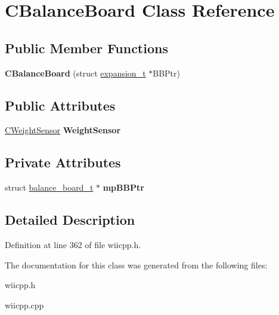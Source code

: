 \hypertarget{class_c_balance_board}{\section{C\-Balance\-Board Class Reference}
\label{class_c_balance_board}
}
\subsection*{Public Member Functions}
\begin{DoxyCompactItemize}
\item 
\hypertarget{class_c_balance_board_a11948fc65e72d912b341ebc866673c1c}{{\bfseries C\-Balance\-Board} (struct \hyperlink{structexpansion__t}{expansion\-\_\-t} $\ast$B\-B\-Ptr)}\label{class_c_balance_board_a11948fc65e72d912b341ebc866673c1c}

\end{DoxyCompactItemize}
\subsection*{Public Attributes}
\begin{DoxyCompactItemize}
\item 
\hypertarget{class_c_balance_board_a3b781ed33ad7255f557d4782728eb045}{\hyperlink{class_c_weight_sensor}{C\-Weight\-Sensor} {\bfseries Weight\-Sensor}}\label{class_c_balance_board_a3b781ed33ad7255f557d4782728eb045}

\end{DoxyCompactItemize}
\subsection*{Private Attributes}
\begin{DoxyCompactItemize}
\item 
\hypertarget{class_c_balance_board_a6e956dd27eede6e72c7d8459d0c15843}{struct \hyperlink{structbalance__board__t}{balance\-\_\-board\-\_\-t} $\ast$ {\bfseries mp\-B\-B\-Ptr}}\label{class_c_balance_board_a6e956dd27eede6e72c7d8459d0c15843}

\end{DoxyCompactItemize}


\subsection{Detailed Description}


Definition at line 362 of file wiicpp.\-h.



The documentation for this class was generated from the following files\-:\begin{DoxyCompactItemize}
\item 
wiicpp.\-h\item 
wiicpp.\-cpp\end{DoxyCompactItemize}
